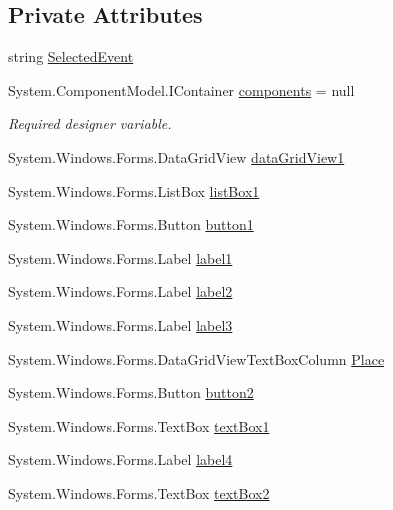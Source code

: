 \subsection*{Private Attributes}
\begin{DoxyCompactItemize}
\item 
string \hyperlink{classPCO_1_1ScoringForm_a3ee8994e65b865d258457cb5ee630321}{Selected\+Event}
\item 
System.\+Component\+Model.\+I\+Container \hyperlink{classPCO_1_1ScoringForm_a31d0a2c3d54de0361b2c24a9b7fc79ca}{components} = null
\begin{DoxyCompactList}\small\item\em Required designer variable. \end{DoxyCompactList}\item 
System.\+Windows.\+Forms.\+Data\+Grid\+View \hyperlink{classPCO_1_1ScoringForm_a6be441dbb55350bc655fb8f150946105}{data\+Grid\+View1}
\item 
System.\+Windows.\+Forms.\+List\+Box \hyperlink{classPCO_1_1ScoringForm_ae367e8f970c46dd72ab89c0cf94f7425}{list\+Box1}
\item 
System.\+Windows.\+Forms.\+Button \hyperlink{classPCO_1_1ScoringForm_a69c667f55b886aaa42926264a52cdf22}{button1}
\item 
System.\+Windows.\+Forms.\+Label \hyperlink{classPCO_1_1ScoringForm_aef70fefb4687a37a3d6447403979f58d}{label1}
\item 
System.\+Windows.\+Forms.\+Label \hyperlink{classPCO_1_1ScoringForm_ac4afcb296a6776fde45bfad184d94d18}{label2}
\item 
System.\+Windows.\+Forms.\+Label \hyperlink{classPCO_1_1ScoringForm_abe5750a537ddaef52bd48cfb4bc860f9}{label3}
\item 
System.\+Windows.\+Forms.\+Data\+Grid\+View\+Text\+Box\+Column \hyperlink{classPCO_1_1ScoringForm_a39860fd3e0df90f8e178f74892c3d714}{Place}
\item 
System.\+Windows.\+Forms.\+Button \hyperlink{classPCO_1_1ScoringForm_a6f1b03a8de4eaceef8f3fefae0299acc}{button2}
\item 
System.\+Windows.\+Forms.\+Text\+Box \hyperlink{classPCO_1_1ScoringForm_a2b7d41c7658e98206aef58560413e0ea}{text\+Box1}
\item 
System.\+Windows.\+Forms.\+Label \hyperlink{classPCO_1_1ScoringForm_a1a064e710cf7d0c5adccf5e250d32ba7}{label4}
\item 
System.\+Windows.\+Forms.\+Text\+Box \hyperlink{classPCO_1_1ScoringForm_ae77e8fcdff11036c032f3fad2f67d2af}{text\+Box2}

\end{DoxyCompactItemize}
